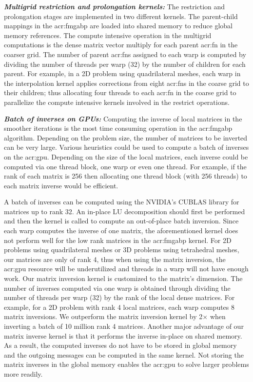 \textbf{\textsl{Multigrid restriction and prolongation kernels:}} The restriction and prolongation stages are implemented in two different kernels.
The parent-child mappings in the \gls{acr:fmgabp} are loaded into shared memory to reduce global memory references.
The compute intensive operation in the multigrid computations is the dense matrix vector multiply for each parent \gls{acr:fn} in the coarser grid.
The number of parent \glspl{acr:fn} assigned to each warp is computed by dividing the number of threads per warp (32) by the number of children for each parent.
For example, in a 2D problem using quadrilateral meshes, each warp in the interpolation kernel applies corrections from eight \glspl{acr:fn} in the coarse grid to their children; thus allocating four threads to each \gls{acr:fn} in the coarse grid to parallelize the compute intensive kernels involved in the restrict operations.


\textbf{\textsl{Batch of inverses on GPUs:}} Computing the inverse of local matrices in the smoother iterations is the most time consuming operation in the \gls{acr:fmgabp} algorithm.
Depending on the problem size, the number of matrices to be inverted can be very large.
Various heuristics could be used to compute a batch of inverses on the \gls{acr:gpu}.
Depending on the size of the local matrices, each inverse could be computed via one thread block, one warp or even one thread.
For example, if the rank of each matrix is 256 then allocating one thread block (with 256 threads) to each matrix inverse would be efficient. 


A batch of inverses can be computed using the {NVIDIA}'s {CUBLAS} library \cite{bib:Nvi11b} for matrices up to rank 32.
An in-place LU decomposition should first be performed and then the  kernel is called to compute an out-of-place batch inversion.
Since each warp computes the inverse of one matrix, the aforementioned kernel does not perform well for the low rank matrices in the \gls{acr:fmgabp} kernel.
For 2D problems using quadrilateral meshes or 3D problems using tetrahedral meshes, our matrices are only of rank 4, thus when using the  matrix inversion, the \gls{acr:gpu} resource will be underutilized and threads in a warp will not have enough work.
Our matrix inversion kernel is customized to the matrix's dimension.
The number of inverses computed via one warp is obtained through dividing the number of threads per warp (32) by the rank of the local dense matrices.
For example, for a 2D problem with rank 4 local matrices, each warp computes 8 matrix inversions.
We outperform the  matrix inversion kernel by 2$\times$ when inverting a batch of 10 million rank 4 matrices.
Another major advantage of our matrix inverse kernel is that it performs the inverse in-place on shared memory.
As a result, the computed inverses do not have to be stored in global memory and the outgoing messages can be computed in the same kernel.
Not storing the matrix inverses in the global memory enables the \gls{acr:gpu} to solve larger problems more readily.


